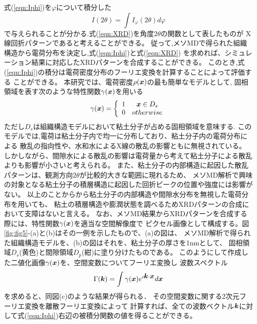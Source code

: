式(\ref{eqn:Iphi})を$\varphi$について積分した
\begin{equation}
	I(2\theta)=\int I_{\varphi}(2\theta) d\varphi
	\label{eqn:XRD}
\end{equation}
で与えられることが分かる.式(\ref{eqn:XRD})を角度$2\theta$の関数として表したものが
X線回折パターンであると考えることができる。
従って,メソMDで得られた組織構造から電荷分布を決定し,式(\ref{eqn:Iphi})と式(\ref{eqn:XRD})
を求めれば、シミュレーション結果に対応したXRDパターンを合成することができる。
このとき,式(\ref{eqn:Iphi})の積分は電荷密度分布のフーリエ変換を計算することによって評価する
ことができる。
本研究では、電荷密度$\rho(\mbox{\boldmath $x$})$の最も簡単なモデルとして,
固相領域を表す次のような特性関数$\gamma(\mbox{\boldmath $x$})$を用いる
\begin{equation}
	\gamma(\mbox{\boldmath $x$})=\left\{
		\begin{array}{cc}
			1 &  \mbox{\boldmath $x$} \in D_s \\
			0 &  otherwise
		\end{array}
	\right.
	\label{eqn:gamma}
\end{equation}
ただし$D_s$は組織構造モデルにおいて粘土分子が占める固相領域を意味する.
このモデルでは,電荷は粘土分子内で均一に分布しており、粘土分子内の電荷分布による
散乱の指向性や、水和水によるX線の散乱の影響ともに無視されている。
しかしながら、間隙水による散乱の影響は電荷量から考えて粘土分子による散乱よりも影響が小さいと考えられる。
また、粘土分子の内部構造に起因した散乱パターンは、観測方向$2\theta$が比較的大きな範囲に現れるため、
メソMD解析で興味の対象となる粘土分子の積層構造に起因した回折ピークの位置や強度には影響がない。
以上のことからから粘土分子の内部構造や間隙水分布を無視した電荷分布を用いても、
粘土の積層構造や膨潤状態を調べるためXRDパターンの合成において支障はないと言える。
なお、メソMD結果からXRDパターンを合成する際には、特性関数$\gamma(\mbox{\boldmath $x$})$を適当な空間解像度で
ピクセル画像として構成する。図\ref{fig:fig5}-(a)と(b)はその一例を示したもので、(a)の図は、
メソMD解析で得られた組織構造モデルを、(b)の図はそれを、粘土分子の厚さを1nmとして、
固相領域$D_s$(黄色)と間隙領域$D_p$(紺)に塗り分けたものである。
このようにして作成した二値化画像$\gamma(\mbox{\boldmath $x$})$を、空間変数についてフーリエ変換し
波数スペクトル
\begin{equation}
	\Gamma(\mbox{\boldmath $k$})=\int \gamma(\mbox{\boldmath $x$}) e^{i\mbox{\boldmath $k$}\cdot\mbox{\boldmath $x$}} d\mbox{\boldmath $x$}
	\label{eqn:Gamma}
\end{equation}
を求めると、同図(c)のような結果が得られる．
その空間変数に関する2次元フーリエ変換を離散フーリエ変換によって
計算すれば、全ての波数ベクトル$\mbox{\boldmath $k$}$に対して式(\ref{eqn:Iphi})右辺の被積分関数の値を得ることができる。
